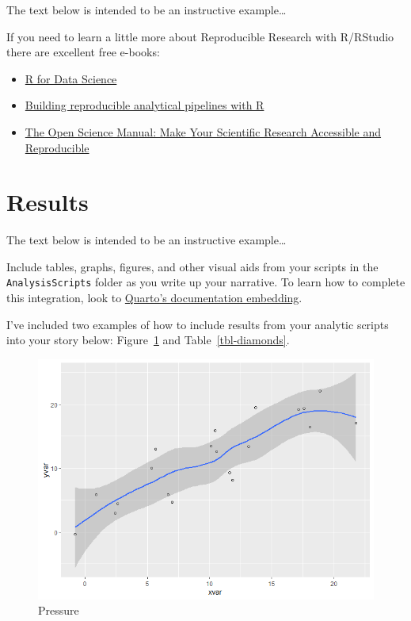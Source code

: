 \documentclass[
  a4paper,
]{article}
\begin{document}
The text below is intended to be an instructive example\ldots{}

If you need to learn a little more about Reproducible Research with
R/RStudio there are excellent free e-books:

\begin{itemize}
\item
  \href{https://r4ds.hadley.nz/}{R for Data Science}
\item
  \href{https://raps-with-r.dev/}{Building reproducible analytical
  pipelines with R}
\item
  \href{https://arca-dpss.github.io/manual-open-science/}{The Open
  Science Manual: Make Your Scientific Research Accessible and
  Reproducible}
\end{itemize}


\section{Results}\label{results}

The text below is intended to be an instructive example\ldots{}

Include tables, graphs, figures, and other visual aids from your scripts
in the \texttt{AnalysisScripts} folder as you write up your narrative.
To learn how to complete this integration, look to
\href{https://quarto.org/docs/authoring/notebook-embed.html}{Quarto's
documentation embedding}.

I've included two examples of how to include results from your analytic
scripts into your story below: Figure~\ref{fig-pressure} and
Table~\ref{tbl-diamonds}.

\begin{figure}

\includegraphics{04-results_files/figure-latex/-Scripts-AnalysisScripts-data_visualization-fig-pressure-output-1.png}

\caption{\label{fig-pressure}Pressure}

\end{figure}%
\end{document}
